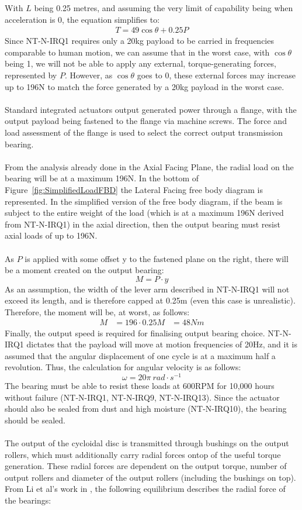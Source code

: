 \documentclass[confidential]{../../../classes/nervtech-engdoc}
\begin{document}
With $L$ being 0.25 metres, and assuming the very limit of capability being when acceleration is 0, the equation simplifies to:
\[
\begin{aligned}
  T = 49\cos\theta + 0.25P
\end{aligned}
\]
Since NT-N-IRQ1 requires only a 20kg payload to be carried in frequencies comparable to human motion, we can assume that in the worst case, with $\cos \theta$ being 1, we will not be able to apply any external, torque-generating forces, represented by $P$.
However, as $\cos \theta$ goes to 0, these external forces may increase up to 196N to match the force generated by a 20kg payload in the worst case.
\\\\
Standard integrated actuators output generated power through a flange, with the output payload being fastened to the flange via machine screws.
The force and load assessment of the flange is used to select the correct output transmission bearing.
\\\\
From the analysis already done in the Axial Facing Plane, the radial load on the bearing will be at a maximum 196N.
In the bottom of Figure~\ref{fig:SimplifiedLoadFBD} the Lateral Facing free body diagram is represented.
In the simplified version of the free body diagram, if the beam is subject to the entire weight of the load (which is at a maximum 196N derived from NT-N-IRQ1) in the axial direction, then the output bearing must resist axial loads of up to 196N.
\\\\
As $P$ is applied with some offset y to the fastened plane on the right, there will be a moment created on the output bearing:
\[
M = P \cdot y
\]
As an assumption, the width of the lever arm described in NT-N-IRQ1 will not exceed its length, and is therefore capped at 0.25m (even this case is unrealistic).
Therefore, the moment will be, at worst, as follows:
\[
\begin{aligned}
  M &= 196 \cdot 0.25
  M &= 48Nm
\end{aligned}
\]
Finally, the output speed is required for finalising output bearing choice.
NT-N-IRQ1 dictates that the payload will move at motion frequencies of 20Hz, and it is assumed that the angular displacement of one cycle is at a maximum half a revolution.
Thus, the calculation for angular velocity is as follows:
\[
  \omega = 20\pi \ rad\cdot s^{-1}
\]
The bearing must be able to resist these loads at 600RPM for 10,000 hours without failure (NT-N-IRQ1, NT-N-IRQ9, NT-N-IRQ13).
Since the actuator should also be sealed from dust and high moisture (NT-N-IRQ10), the bearing should be sealed.
\\\\
The output of the cycloidal disc is transmitted through bushings on the output rollers, which must additionally carry radial forces ontop of the useful torque generation.
These radial forces are dependent on the output torque, number of output rollers and diameter of the output rollers (including the bushings on top).
From Li et al's work in \cite{OutputRollerBearingAnalysis}, the following equilibrium describes the radial force of the bearings:
\end{document}
